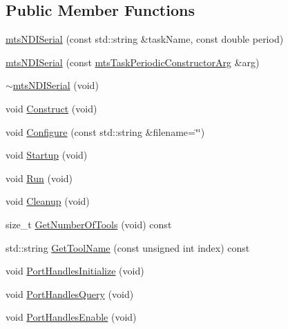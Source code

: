 \subsection*{Public Member Functions}
\begin{DoxyCompactItemize}
\item 
\hyperlink{classmts_n_d_i_serial_a3ecbc6380a7f6b50b826b797fe4c3b56}{mts\+N\+D\+I\+Serial} (const std\+::string \&task\+Name, const double period)
\item 
\hyperlink{classmts_n_d_i_serial_a5263cb07bf47fa816c500c3edd4d75da}{mts\+N\+D\+I\+Serial} (const \hyperlink{classmts_task_periodic_constructor_arg}{mts\+Task\+Periodic\+Constructor\+Arg} \&arg)
\item 
\hyperlink{classmts_n_d_i_serial_a3fd41ef271317aa18975694349345251}{$\sim$mts\+N\+D\+I\+Serial} (void)
\item 
void \hyperlink{classmts_n_d_i_serial_a55ed13bb299039b71fc05393588ffd0e}{Construct} (void)
\item 
void \hyperlink{classmts_n_d_i_serial_a5e0f4bd8a0b80e7c2e64dae6f0dd8d93}{Configure} (const std\+::string \&filename=\char`\"{}\char`\"{})
\item 
void \hyperlink{classmts_n_d_i_serial_a5a398ff09fd191621c849e527b1809ed}{Startup} (void)
\item 
void \hyperlink{classmts_n_d_i_serial_a72e2d58128b11e5d376db3ec8b3b81cb}{Run} (void)
\item 
void \hyperlink{classmts_n_d_i_serial_adbc7806bbb9185b34d28933441665440}{Cleanup} (void)
\item 
size\+\_\+t \hyperlink{classmts_n_d_i_serial_a6289bff93113fd59d316094848370212}{Get\+Number\+Of\+Tools} (void) const 
\item 
std\+::string \hyperlink{classmts_n_d_i_serial_a31848367d054d35027d2d4d8dae73bb9}{Get\+Tool\+Name} (const unsigned int index) const 
\item 
void \hyperlink{classmts_n_d_i_serial_abd97ea132bdac2d4698445529f878027}{Port\+Handles\+Initialize} (void)
\item 
void \hyperlink{classmts_n_d_i_serial_a01fdad2bcde8d45ecae952fccb3b5750}{Port\+Handles\+Query} (void)
\item 
void \hyperlink{classmts_n_d_i_serial_a984ba3c4655830850f78dd27311ff8b2}{Port\+Handles\+Enable} (void)
\end{DoxyCompactItemize}
